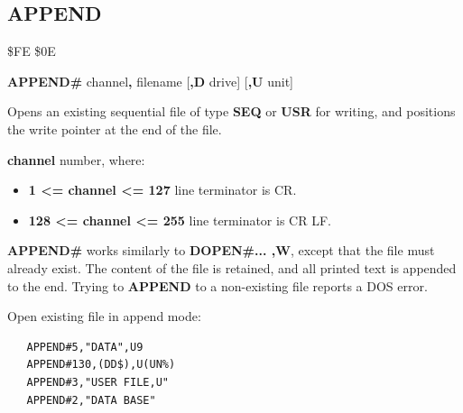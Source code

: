
\newpage
\subsection{APPEND}
\begin{description}[leftmargin=2cm,style=nextline]
\item [Token:] \$FE \$0E
\item [Format:]
  {\bf APPEND\#} channel{\bf,} filename [{\bf,D} drive] [{\bf,U} unit]
\item [Usage:]
   Opens an existing sequential file of type
   {\bf SEQ} or {\bf USR} for writing, and positions the write pointer
   at the end of the file.

    {\bf channel} number, where:
    \begin{itemize}
        \item {\bf 1 <= channel <= 127} line terminator is CR.
        \item {\bf 128 <= channel <= 255} line terminator is CR LF.
    \end{itemize}

   \filenamedefinition

   \drivedefinition

   \unitdefinition

\item [Remarks:]
   {\bf APPEND\#} works similarly to {\bf DOPEN\#... ,W},
   except that the file must already exist.
   The content of the file is retained, and all printed text
   is appended to the end.
   Trying to {\bf APPEND} to a non-existing file reports a DOS error.

\item [Examples:] Open existing file in append mode:

\begin{tcolorbox}[colback=black,coltext=white]
\verbatimfont{\codefont}
\begin{verbatim}
   APPEND#5,"DATA",U9
   APPEND#130,(DD$),U(UN%)
   APPEND#3,"USER FILE,U"
   APPEND#2,"DATA BASE"
\end{verbatim}
\end{tcolorbox}
\end{description}


\newpage
